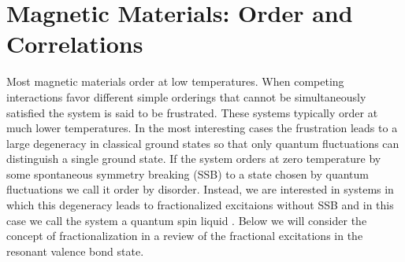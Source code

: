 \documentclass[aps,pra,preprint,groupedaddress]{revtex4-1}
\newcommand{\1}{\mathds{1}}
\begin{document}
\section{Magnetic Materials: Order and Correlations}

Most magnetic materials order at low temperatures. When competing interactions favor different simple orderings that cannot be simultaneously satisfied the system is said to be frustrated. These systems typically order at much lower temperatures. In the most interesting cases the frustration leads to a large degeneracy in classical ground states so that only quantum fluctuations can distinguish a single ground state. If the system orders at zero temperature by some spontaneous symmetry breaking (SSB) to a state chosen by quantum fluctuations we call it order by disorder. Instead, we are interested in systems in which this degeneracy leads to fractionalized excitaions without SSB and in this case we call the system a quantum spin liquid \cite{Mila}. Below we will consider the concept of fractionalization in a review of the fractional excitations in the resonant valence bond state.
\end{document}
